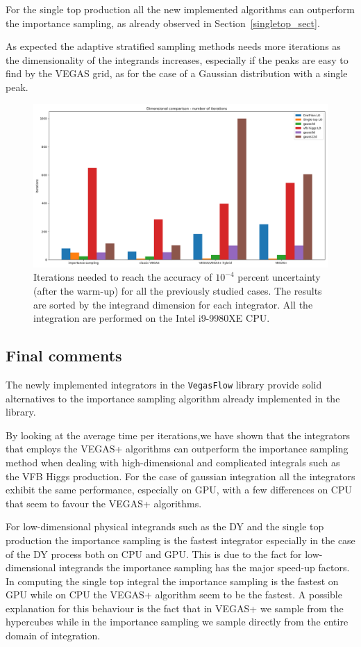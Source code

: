 \documentclass[../main/main.tex]{subfiles}
\begin{document}
For the single top production all the new implemented algorithms can outperform the importance sampling, as already observed in Section~\ref{singletop_sect}.

As expected the adaptive stratified sampling methods needs more iterations as the dimensionality of the integrands increases, especially if the peaks are easy to find by the VEGAS grid, as for the case of a Gaussian distribution with a single peak.
\begin{figure}[h]
	\centering
	\includegraphics[width=\textwidth]{../images/dim_comparison_iter.png}
	\caption{Iterations needed to reach the accuracy of $10^{-4}$ percent uncertainty (after the warm-up) for all the previously studied cases. The results are sorted by the integrand dimension for each integrator. All the integration are performed on the Intel i9-9980XE CPU. }
	\label{cpu_iter_comparison}
\end{figure}

\subsection{Final comments}
The newly implemented integrators in the \texttt{VegasFlow} library provide solid alternatives to the importance sampling algorithm already implemented in the library.

By looking at the average time per iterations,we have shown that the integrators that employs the VEGAS+ algorithms can outperform the importance sampling method when dealing with high-dimensional and complicated integrals such as the VFB Higgs production.
For the case of gaussian integration all the integrators exhibit the same performance, especially on GPU, with a few differences on CPU that seem to favour the VEGAS+ algorithms.

For low-dimensional physical integrands such as the DY and the single top production the importance sampling is the fastest integrator especially in the case of the DY process both on CPU and GPU. This is due to the fact for low-dimensional integrands the importance sampling has the major speed-up factors.
In computing the single top integral the importance sampling is the fastest on GPU while on CPU the VEGAS+ algorithm seem to be the fastest. A possible explanation for this behaviour is the fact that in VEGAS+ we sample from the hypercubes while in the importance sampling we sample directly from the entire domain of integration.
\end{document}
